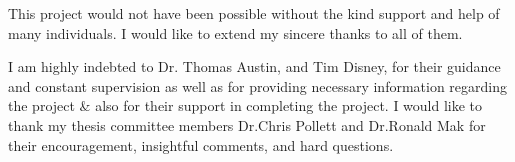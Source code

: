 This project would not have been possible without the kind support and help of many individuals. I would like to extend my sincere thanks to all of them.

I am highly indebted to Dr. Thomas Austin, and Tim Disney,  for their guidance and constant supervision as well as for providing necessary information regarding the project \& also for their support in completing the project. I would like to thank my thesis committee members Dr.Chris Pollett and Dr.Ronald Mak for their encouragement, insightful comments, and hard questions.